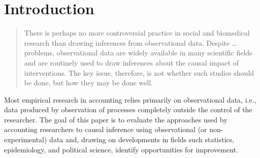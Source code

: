 \documentclass[11pt,reqno]{amsart}
\begin{document}
\clearpage
  
\section{Introduction}

\begin{quotation}
	There is perhaps no more controversial practice in social and biomedical research than drawing inferences from observational data.
	Despite \dots problems, observational data are widely available in many scientific fields and are routinely used to draw inferences about the causal impact of interventions.
	The key issue, therefore, is not whether such studies should be done, but how they may be done well.
\end{quotation}


Most empirical research in accounting relies primarily on observational data, i.e., data produced by observation of processes completely outside the control of the researcher. The goal of this paper is to evaluate the approaches used by accounting researchers to causal inference using observational (or non-experimental) data and, drawing on developments in fields such statistics, epidemiology, and political science, identify opportunities for improvement.
\end{document}
